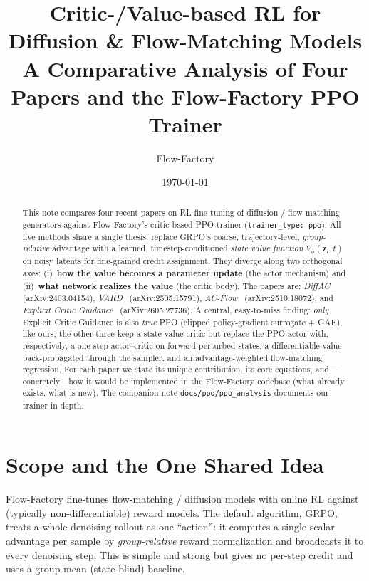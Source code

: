 \documentclass[11pt]{article}
\title{\textbf{Critic-/Value-based RL for Diffusion \& Flow-Matching Models}\\[2pt]
\large A Comparative Analysis of Four Papers and the Flow-Factory PPO Trainer}
\author{Flow-Factory}
\date{\today}
\theoremstyle{remark}
\newcommand{\zt}{\bm{z}}
\newcommand{\Vphi}{V_\phi}
\begin{document}
\maketitle

\begin{abstract}
This note compares four recent papers on RL fine-tuning of diffusion / flow-matching
generators against Flow-Factory's critic-based PPO trainer (\texttt{trainer\_type:
ppo}). All five methods share a single thesis: replace GRPO's coarse, trajectory-level,
\emph{group-relative} advantage with a learned, timestep-conditioned \emph{state value
function} $\Vphi(\zt_t, t)$ on noisy latents for fine-grained credit assignment. They
diverge along two orthogonal axes: (i)~\textbf{how the value becomes a parameter
update} (the actor mechanism) and (ii)~\textbf{what network realizes the value} (the
critic body). The papers are: \emph{DiffAC}~\cite{zhou2024diffac}
(arXiv:2403.04154), \emph{VARD}~\cite{dai2025vard} (arXiv:2505.15791),
\emph{AC-Flow}~\cite{fan2025acflow} (arXiv:2510.18072), and \emph{Explicit Critic
Guidance}~\cite{liang2026critic} (arXiv:2605.27736). A central, easy-to-miss finding:
\emph{only} Explicit Critic Guidance is also \emph{true} PPO (clipped policy-gradient
surrogate + GAE), like ours; the other three keep a state-value critic but replace the
PPO actor with, respectively, a one-step actor--critic on forward-perturbed states, a
differentiable value back-propagated through the sampler, and an advantage-weighted
flow-matching regression. For each paper we state its unique contribution, its core
equations, and---concretely---how it would be implemented in the Flow-Factory codebase
(what already exists, what is new). The companion note \texttt{docs/ppo/ppo\_analysis}
documents our trainer in depth.
\end{abstract}

\tableofcontents

\section{Scope and the One Shared Idea}
\label{sec:scope}

Flow-Factory fine-tunes flow-matching / diffusion models with online RL against
(typically non-differentiable) reward models. The default algorithm, GRPO, treats a
whole denoising rollout as one ``action'': it computes a single scalar advantage per
sample by \emph{group-relative} reward normalization and broadcasts it to every
denoising step. This is simple and strong but gives no per-step credit and uses a
group-mean (state-blind) baseline.
\end{document}
